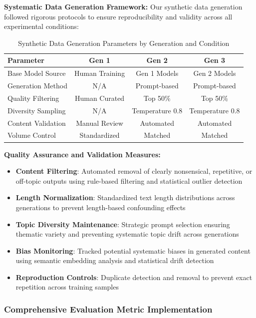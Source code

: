 \documentclass{article}
\begin{document}
\textbf{Systematic Data Generation Framework:}
Our synthetic data generation followed rigorous protocols to ensure reproducibility and validity across all experimental conditions:

\begin{table}[H]
\centering
\caption{Synthetic Data Generation Parameters by Generation and Condition}
\label{tab:data_generation_comprehensive}
\begin{tabular}{lccc}
\toprule
\textbf{Parameter} & \textbf{Gen 1} & \textbf{Gen 2} & \textbf{Gen 3} \\
\midrule
Base Model Source & Human Training & Gen 1 Models & Gen 2 Models \\
Generation Method & N/A & Prompt-based & Prompt-based \\
Quality Filtering & Human Curated & Top 50\% & Top 50\% \\
Diversity Sampling & N/A & Temperature 0.8 & Temperature 0.8 \\
Content Validation & Manual Review & Automated & Automated \\
Volume Control & Standardized & Matched & Matched \\
\bottomrule
\end{tabular}
\end{table}

\textbf{Quality Assurance and Validation Measures:}
\begin{itemize}
    \item \textbf{Content Filtering}: Automated removal of clearly nonsensical, repetitive, or off-topic outputs using rule-based filtering and statistical outlier detection
    \item \textbf{Length Normalization}: Standardized text length distributions across generations to prevent length-based confounding effects
    \item \textbf{Topic Diversity Maintenance}: Strategic prompt selection ensuring thematic variety and preventing systematic topic drift across generations
    \item \textbf{Bias Monitoring}: Tracked potential systematic biases in generated content using semantic embedding analysis and statistical drift detection
    \item \textbf{Reproduction Controls}: Duplicate detection and removal to prevent exact repetition across training samples
\end{itemize}

\subsubsection{Comprehensive Evaluation Metric Implementation}
\end{document}
